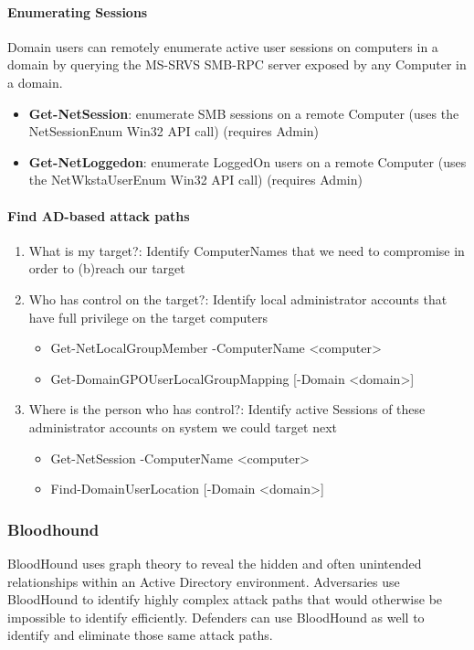 \paragraph{Enumerating Sessions}
Domain users can remotely enumerate active user sessions on computers in a domain by querying the MS-SRVS SMB-RPC server exposed by any Computer in a domain.
\begin{itemize}
  \item \textbf{Get-NetSession}: enumerate SMB sessions on a remote Computer (uses the NetSessionEnum Win32 API call) (requires Admin)
  \item \textbf{Get-NetLoggedon}: enumerate LoggedOn users on a remote Computer (uses the NetWkstaUserEnum Win32 API call) (requires Admin)
\end{itemize}

\paragraph{Find AD-based attack paths}
\begin{enumerate}
  \item What is my target?: Identify ComputerNames that we need to compromise in order to (b)reach our target
  \item Who has control on the target?: Identify local administrator accounts that have full privilege on the target computers
  \begin{itemize}
    \item Get-NetLocalGroupMember -ComputerName <computer>
    \item Get-DomainGPOUserLocalGroupMapping [-Domain <domain>]
  \end{itemize}
  \item Where is the person who has control?: Identify active Sessions of these administrator accounts on system we could target next
  \begin{itemize}
    \item Get-NetSession -ComputerName <computer>
    \item Find-DomainUserLocation [-Domain <domain>]
  \end{itemize}
\end{enumerate}

\subsubsection{Bloodhound}
BloodHound uses graph theory to reveal the hidden and often unintended relationships within an Active Directory environment.
Adversaries use BloodHound to identify highly complex attack paths that would otherwise be impossible to identify efficiently.
Defenders can use BloodHound as well to identify and eliminate those same attack paths.

